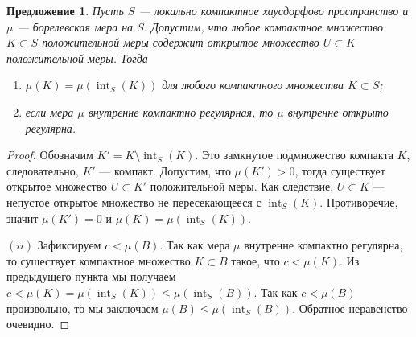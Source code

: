 \documentclass[12pt]{article}
\newtheorem{proposition}[theorem]{Предложение}
\begin{document}
\begin{proposition}\label{NormalMeasCharac} Пусть $S$ --- локально компактное
    хаусдорфово пространство и $\mu$ --- борелевская мера на $S$. Допустим, что
    любое компактное множество $K\subset S$ положительной меры содержит открытое
    множество $U\subset K$ положительной меры. Тогда
    \begin{enumerate}[label = (\roman*)]
        \item $\mu(K)=\mu(\operatorname{int}_S(K))$ для любого компактного
              множества $K\subset S$;

        \item если мера $\mu$ внутренне компактно регулярная, то $\mu$ внутренне
              открыто регулярна.
    \end{enumerate}

\end{proposition}
\begin{proof} Обозначим $K'=K\setminus \operatorname{int}_S(K)$. Это замкнутое
    подмножество компакта $K$, следовательно, $K'$ --- компакт. Допустим, что
    $\mu(K')>0$, тогда существует открытое множество $U\subset K'$ положительной
    меры. Как следствие, $U\subset K$ --- непустое открытое множество не
    пересекающееся с $\operatorname{int}_S(K)$. Противоречие, значит $\mu(K')=0$
    и $\mu(K)=\mu(\operatorname{int}_S(K))$.

    $(ii)$ Зафиксируем $c<\mu(B)$. Так как мера $\mu$ внутренне компактно
    регулярна, то существует компактное множество $K\subset B$ такое, что
    $c<\mu(K)$. Из предыдущего пункта мы получаем
    $c<\mu(K)=\mu(\operatorname{int}_S(K))\leq\mu(\operatorname{int}_S(B))$. Так
    как $c<\mu(B)$ произвольно, то мы заключаем
    $\mu(B)\leq\mu(\operatorname{int}_S(B))$. Обратное неравенство очевидно.
\end{proof}
\end{document}
